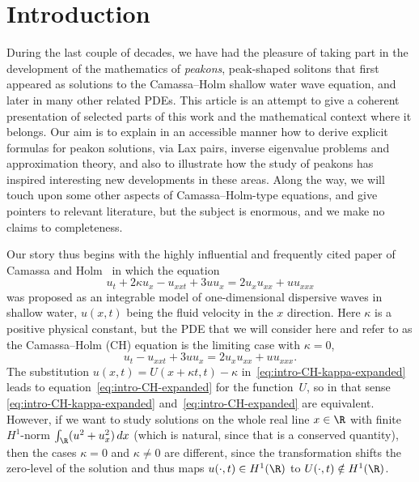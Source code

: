 \documentclass[10pt,a4paper]{article} \pdfoutput=1 
\begin{document}
\twocolumn[
\begin{@twocolumnfalse}
\makefrontmatter{}
\end{@twocolumnfalse}
]


\tableofcontents{}

\section{Introduction}
\label{sec:intro}

During the last couple of decades, we have had the pleasure of taking
part in the development of the mathematics of \emph{peakons},
peak-shaped solitons that first appeared as solutions to the
Camassa--Holm shallow water wave equation, and later in many other
related PDEs.
This article is an attempt to give a coherent presentation of selected parts
of this work and the mathematical context where it belongs.
Our aim is to explain in an accessible manner how to
derive explicit formulas for peakon solutions, via Lax pairs, inverse
eigenvalue problems and approximation theory,
and also to illustrate how the study of peakons has inspired
interesting new developments in these areas.
Along the way, we will touch upon some other aspects
of Camassa--Holm-type equations, and give pointers to relevant literature,
but the subject is enormous, and we make no claims to completeness.

Our story thus begins with the highly influential and frequently cited paper of Camassa and Holm~\cite{camassa-holm:1993:CH-orginal-paper} in which the equation
\begin{equation}
  \label{eq:intro-CH-kappa-expanded}
  u_t + 2 \kappa u_x - u_{xxt} + 3 u u_x = 2  u_x u_{xx} + u u_{xxx}
\end{equation}
was proposed as an integrable model of one-dimensional dispersive waves in shallow water,
$u(x,t)$ being the fluid velocity in the $x$ direction.
Here $\kappa$ is a positive physical constant,
but the PDE that we will consider here
and refer to as the Camassa--Holm (CH) equation
is the limiting case with $\kappa = 0$,
\begin{equation}
  \label{eq:intro-CH-expanded}
  u_t - u_{xxt} + 3 u u_x = 2  u_x u_{xx} + u u_{xxx}
  .
\end{equation}
The substitution $u(x,t) = U(x + \kappa t, t) - \kappa$ in~\eqref{eq:intro-CH-kappa-expanded}
leads to equation~\eqref{eq:intro-CH-expanded} for the function~$U$,
so in that sense \eqref{eq:intro-CH-kappa-expanded} and~\eqref{eq:intro-CH-expanded}
are equivalent.
However, if we want to study solutions on the whole real line $x \in \R$ with finite $H^1$-norm
$\int_\R (u^2 + u_x^2) \, dx$
(which is natural, since that is a conserved quantity),
then the cases $\kappa = 0$ and $\kappa \neq 0$ are different,
since the transformation shifts the zero-level
of the solution and thus maps $u(\cdot,t) \in H^1(\R)$ to $U(\cdot,t) \notin H^1(\R)$.
\end{document}
